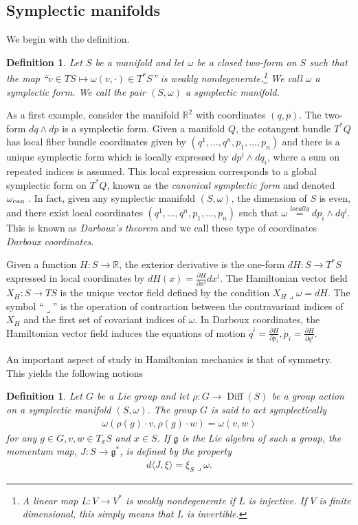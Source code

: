 \documentclass[12pt]{amsart}
\newcommand{\pder}[2]{\ensuremath{\frac{\partial #1}{\partial #2}}}
\newcommand{\R}{\ensuremath{\mathbb{R}}}
\newtheorem{defn}[thm]{Definition}
\DeclareMathOperator{\Diff}{Diff}
\begin{document}
\subsection{Symplectic manifolds}
\label{sec:Symplectic}
We begin with the definition.
\begin{defn}
  Let $S$ be a manifold
  and let $\omega$ be a closed two-form on $S$ such that the map
  ``$v \in TS \mapsto \omega( v , \cdot ) \in T^*S$'' is weakly nondegenerate.\footnote{
    A linear map $L:V \to V^*$ is \emph{weakly nondegenerate} if $L$ is injective.  If $V$ is finite dimensional, this simply means that $L$ is invertible.}
  We call $\omega$ a \emph{symplectic form}.
  We call the pair $(S,\omega)$ a \emph{symplectic manifold}.
\end{defn}
As a first example, consider the manifold $\R^2$
with coordinates $(q,p)$.
The two-form $dq \wedge dp$ is a symplectic form.
Given a manifold $Q$,
the cotangent bundle $T^*Q$ has local fiber bundle coordinates
given by $(q^1,\dots, q^n,p_1,\dots,p_n)$ and there is a unique symplectic form
which is locally expressed by $dp^i \wedge dq_i$, where
a sum on repeated indices is assumed.
This local expression corresponds to a global symplectic
form on $T^*Q$, known as the \emph{canonical symplectic form}
and denoted $\omega_{\rm can}$ \cite[Theorem 3.2.10]{FOM}.
In fact, given any symplectic manifold $(S,\omega)$, the dimension of $S$
is even, and there exist local coordinates $(q^1,\dots,q^n,p_1,\dots,p_n)$
such that $\omega \stackrel{locally}{=} dp_i \wedge dq^i$.
This is known as \emph{Darboux's theorem} and we call these type of
coordinates \emph{Darboux coordinates}\cite[Theorem 3.2.2]{FOM}.

Given a function $H:S \to \mathbb{R}$,
the exterior derivative is the one-form $dH:S \to T^*S$
expressed in local coordinates by $dH(x) = \pder{H}{x^i} dx^i$.
The Hamiltonian vector field $X_H:S \to TS$ is the unique vector
field defined by the condition
$
  X_H \lrcorner \omega = dH.
$
The symbol ``$\lrcorner$'' is the operation of contraction between
the contravariant indices of $X_H$ and the first set of covariant
indices of $\omega$.
In Darboux coordinates, the Hamiltonian vector field induces the
equations of motion $\dot{q}^i = \pder{H}{p_i}, \dot{p}_i = \pder{H}{q^i}$.


An important aspect of study in Hamiltonian mechanics is that of symmetry.
This yields the following notions

\begin{defn}
  Let $G$ be a Lie group and let $\rho:G \to \Diff(S)$ be a group action on a symplectic manifold $(S,\omega)$.
  The group $G$ is said to \emph{act symplectically}
  \begin{align*}
    \omega( \rho( g ) \cdot v , \rho(g) \cdot w) = \omega(v,w)
  \end{align*}
  for any $g \in G, v,w \in T_xS$ and $x \in S$.
  If $\mathfrak{g}$ is the Lie algebra of such a group,
  the \emph{momentum map}, $J:S \to \mathfrak{g}^*$,
  is defined by the property
  \begin{align*}
    d \langle J , \xi \rangle = \xi_S \lrcorner \omega.
  \end{align*}
\end{defn}
\end{document}
